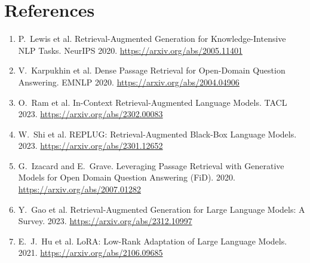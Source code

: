 \documentclass[11pt]{article}
\begin{document}
\section*{References}
\begin{enumerate}\small
  \item P.~Lewis et al. Retrieval-Augmented Generation for Knowledge-Intensive NLP Tasks. NeurIPS 2020. \url{https://arxiv.org/abs/2005.11401}
  \item V.~Karpukhin et al. Dense Passage Retrieval for Open-Domain Question Answering. EMNLP 2020. \url{https://arxiv.org/abs/2004.04906}
  \item O.~Ram et al. In-Context Retrieval-Augmented Language Models. TACL 2023. \url{https://arxiv.org/abs/2302.00083}
  \item W.~Shi et al. REPLUG: Retrieval-Augmented Black-Box Language Models. 2023. \url{https://arxiv.org/abs/2301.12652}
  \item G.~Izacard and E.~Grave. Leveraging Passage Retrieval with Generative Models for Open Domain Question Answering (FiD). 2020. \url{https://arxiv.org/abs/2007.01282}
  \item Y.~Gao et al. Retrieval-Augmented Generation for Large Language Models: A Survey. 2023. \url{https://arxiv.org/abs/2312.10997}
  \item E.~J.~Hu et al. LoRA: Low-Rank Adaptation of Large Language Models. 2021. \url{https://arxiv.org/abs/2106.09685}
\end{enumerate}
\end{document}
